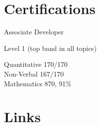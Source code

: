 \documentclass[a4paper]{custom-resume}
\begin{document}
\begin{minipage}[t][0.82\textheight]{0.33\textwidth}
\vfill


\section{Certifications}

Associate Developer

Level 1 (top band in all topics)

Quantitative \tabto{2.2cm} 170/170 \\
Non-Verbal \tabto{2.2cm} 167/170 \\
Mathematics \tabto{2.2cm} 870, 91\%

\vfill


\section{Links}


\end{minipage}
\hfill
\end{document}
